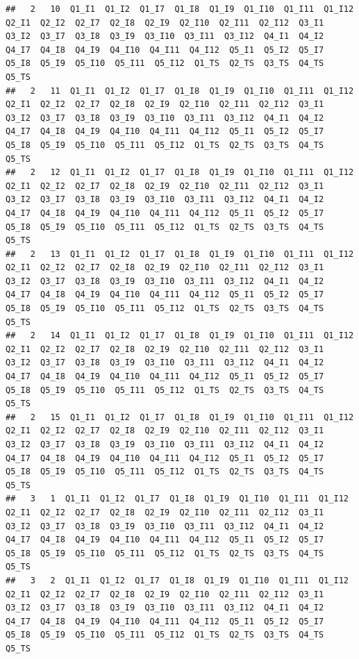 \documentclass[]{book}
\begin{document}
\begin{verbatim}
##   2   10  Q1_I1  Q1_I2  Q1_I7  Q1_I8  Q1_I9  Q1_I10  Q1_I11  Q1_I12  Q2_I1  Q2_I2  Q2_I7  Q2_I8  Q2_I9  Q2_I10  Q2_I11  Q2_I12  Q3_I1  Q3_I2  Q3_I7  Q3_I8  Q3_I9  Q3_I10  Q3_I11  Q3_I12  Q4_I1  Q4_I2  Q4_I7  Q4_I8  Q4_I9  Q4_I10  Q4_I11  Q4_I12  Q5_I1  Q5_I2  Q5_I7  Q5_I8  Q5_I9  Q5_I10  Q5_I11  Q5_I12  Q1_TS  Q2_TS  Q3_TS  Q4_TS  Q5_TS
##   2   11  Q1_I1  Q1_I2  Q1_I7  Q1_I8  Q1_I9  Q1_I10  Q1_I11  Q1_I12  Q2_I1  Q2_I2  Q2_I7  Q2_I8  Q2_I9  Q2_I10  Q2_I11  Q2_I12  Q3_I1  Q3_I2  Q3_I7  Q3_I8  Q3_I9  Q3_I10  Q3_I11  Q3_I12  Q4_I1  Q4_I2  Q4_I7  Q4_I8  Q4_I9  Q4_I10  Q4_I11  Q4_I12  Q5_I1  Q5_I2  Q5_I7  Q5_I8  Q5_I9  Q5_I10  Q5_I11  Q5_I12  Q1_TS  Q2_TS  Q3_TS  Q4_TS  Q5_TS
##   2   12  Q1_I1  Q1_I2  Q1_I7  Q1_I8  Q1_I9  Q1_I10  Q1_I11  Q1_I12  Q2_I1  Q2_I2  Q2_I7  Q2_I8  Q2_I9  Q2_I10  Q2_I11  Q2_I12  Q3_I1  Q3_I2  Q3_I7  Q3_I8  Q3_I9  Q3_I10  Q3_I11  Q3_I12  Q4_I1  Q4_I2  Q4_I7  Q4_I8  Q4_I9  Q4_I10  Q4_I11  Q4_I12  Q5_I1  Q5_I2  Q5_I7  Q5_I8  Q5_I9  Q5_I10  Q5_I11  Q5_I12  Q1_TS  Q2_TS  Q3_TS  Q4_TS  Q5_TS
##   2   13  Q1_I1  Q1_I2  Q1_I7  Q1_I8  Q1_I9  Q1_I10  Q1_I11  Q1_I12  Q2_I1  Q2_I2  Q2_I7  Q2_I8  Q2_I9  Q2_I10  Q2_I11  Q2_I12  Q3_I1  Q3_I2  Q3_I7  Q3_I8  Q3_I9  Q3_I10  Q3_I11  Q3_I12  Q4_I1  Q4_I2  Q4_I7  Q4_I8  Q4_I9  Q4_I10  Q4_I11  Q4_I12  Q5_I1  Q5_I2  Q5_I7  Q5_I8  Q5_I9  Q5_I10  Q5_I11  Q5_I12  Q1_TS  Q2_TS  Q3_TS  Q4_TS  Q5_TS
##   2   14  Q1_I1  Q1_I2  Q1_I7  Q1_I8  Q1_I9  Q1_I10  Q1_I11  Q1_I12  Q2_I1  Q2_I2  Q2_I7  Q2_I8  Q2_I9  Q2_I10  Q2_I11  Q2_I12  Q3_I1  Q3_I2  Q3_I7  Q3_I8  Q3_I9  Q3_I10  Q3_I11  Q3_I12  Q4_I1  Q4_I2  Q4_I7  Q4_I8  Q4_I9  Q4_I10  Q4_I11  Q4_I12  Q5_I1  Q5_I2  Q5_I7  Q5_I8  Q5_I9  Q5_I10  Q5_I11  Q5_I12  Q1_TS  Q2_TS  Q3_TS  Q4_TS  Q5_TS
##   2   15  Q1_I1  Q1_I2  Q1_I7  Q1_I8  Q1_I9  Q1_I10  Q1_I11  Q1_I12  Q2_I1  Q2_I2  Q2_I7  Q2_I8  Q2_I9  Q2_I10  Q2_I11  Q2_I12  Q3_I1  Q3_I2  Q3_I7  Q3_I8  Q3_I9  Q3_I10  Q3_I11  Q3_I12  Q4_I1  Q4_I2  Q4_I7  Q4_I8  Q4_I9  Q4_I10  Q4_I11  Q4_I12  Q5_I1  Q5_I2  Q5_I7  Q5_I8  Q5_I9  Q5_I10  Q5_I11  Q5_I12  Q1_TS  Q2_TS  Q3_TS  Q4_TS  Q5_TS
##   3   1  Q1_I1  Q1_I2  Q1_I7  Q1_I8  Q1_I9  Q1_I10  Q1_I11  Q1_I12  Q2_I1  Q2_I2  Q2_I7  Q2_I8  Q2_I9  Q2_I10  Q2_I11  Q2_I12  Q3_I1  Q3_I2  Q3_I7  Q3_I8  Q3_I9  Q3_I10  Q3_I11  Q3_I12  Q4_I1  Q4_I2  Q4_I7  Q4_I8  Q4_I9  Q4_I10  Q4_I11  Q4_I12  Q5_I1  Q5_I2  Q5_I7  Q5_I8  Q5_I9  Q5_I10  Q5_I11  Q5_I12  Q1_TS  Q2_TS  Q3_TS  Q4_TS  Q5_TS
##   3   2  Q1_I1  Q1_I2  Q1_I7  Q1_I8  Q1_I9  Q1_I10  Q1_I11  Q1_I12  Q2_I1  Q2_I2  Q2_I7  Q2_I8  Q2_I9  Q2_I10  Q2_I11  Q2_I12  Q3_I1  Q3_I2  Q3_I7  Q3_I8  Q3_I9  Q3_I10  Q3_I11  Q3_I12  Q4_I1  Q4_I2  Q4_I7  Q4_I8  Q4_I9  Q4_I10  Q4_I11  Q4_I12  Q5_I1  Q5_I2  Q5_I7  Q5_I8  Q5_I9  Q5_I10  Q5_I11  Q5_I12  Q1_TS  Q2_TS  Q3_TS  Q4_TS  Q5_TS

\end{verbatim}
\end{document}
